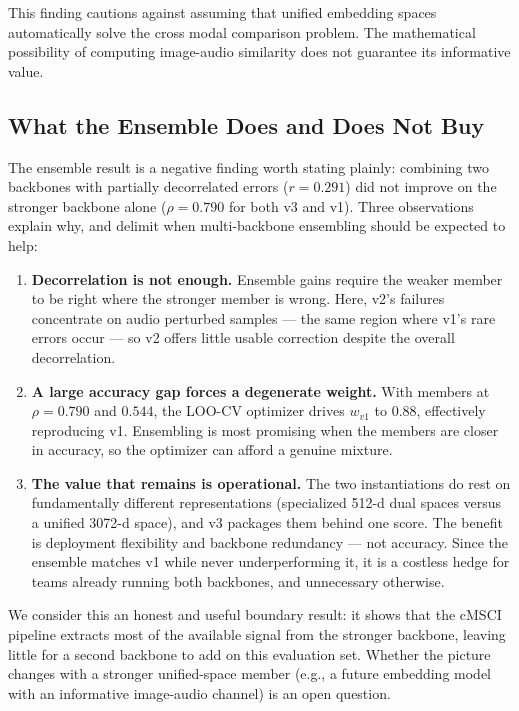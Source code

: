 This finding cautions against assuming that unified embedding spaces automatically solve the cross modal comparison problem. The mathematical possibility of computing image-audio similarity does not guarantee its informative value.

\subsection{What the Ensemble Does and Does Not Buy}\label{sec:ensemble-discussion}

The ensemble result is a negative finding worth stating plainly: combining two backbones with partially decorrelated errors ($r = 0.291$) did not improve on the stronger backbone alone ($\rho = 0.790$ for both v3 and v1). Three observations explain why, and delimit when multi-backbone ensembling should be expected to help:

\begin{enumerate}
\item \textbf{Decorrelation is not enough.} Ensemble gains require the weaker member to be right where the stronger member is wrong. Here, v2's failures concentrate on audio perturbed samples — the same region where v1's rare errors occur — so v2 offers little usable correction despite the overall decorrelation.

\item \textbf{A large accuracy gap forces a degenerate weight.} With members at $\rho = 0.790$ and $0.544$, the LOO-CV optimizer drives $w_{v1}$ to 0.88, effectively reproducing v1. Ensembling is most promising when the members are closer in accuracy, so the optimizer can afford a genuine mixture.

\item \textbf{The value that remains is operational.} The two instantiations do rest on fundamentally different representations (specialized 512-d dual spaces versus a unified 3072-d space), and v3 packages them behind one score. The benefit is deployment flexibility and backbone redundancy — not accuracy. Since the ensemble matches v1 while never underperforming it, it is a costless hedge for teams already running both backbones, and unnecessary otherwise.
\end{enumerate}

We consider this an honest and useful boundary result: it shows that the cMSCI pipeline extracts most of the available signal from the stronger backbone, leaving little for a second backbone to add on this evaluation set. Whether the picture changes with a stronger unified-space member (e.g., a future embedding model with an informative image-audio channel) is an open question.

